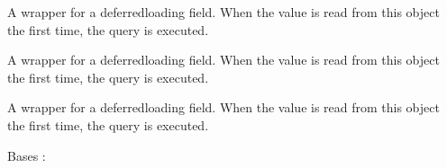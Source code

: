 \documentclass[letterpaper,10pt,french]{sphinxmanual}
\begin{document}
\begin{fulllineitems}

\begin{fulllineitems}
\label{\detokenize{index:bookings.models.Capacity.max_places}}
\pysigstartsignatures
\pysigline
{}
\pysigstopsignatures
\sphinxAtStartPar
A wrapper for a deferred\sphinxhyphen{}loading field. When the value is read from this
object the first time, the query is executed.

\end{fulllineitems}


\begin{fulllineitems}
\label{\detokenize{index:bookings.models.Capacity.number_locations}}
\pysigstartsignatures
\pysigline
{}
\pysigstopsignatures
\sphinxAtStartPar
A wrapper for a deferred\sphinxhyphen{}loading field. When the value is read from this
object the first time, the query is executed.

\end{fulllineitems}


\begin{fulllineitems}
\label{\detokenize{index:bookings.models.Capacity.number_mobile_homes}}
\pysigstartsignatures
\pysigline
{}
\pysigstopsignatures
\sphinxAtStartPar
A wrapper for a deferred\sphinxhyphen{}loading field. When the value is read from this
object the first time, the query is executed.

\end{fulllineitems}


\begin{fulllineitems}
\label{\detokenize{index:bookings.models.Capacity.DoesNotExist}}
\pysigstartsignatures
\pysigline
{}
\pysigstopsignatures
\sphinxAtStartPar
Bases : 


\end{fulllineitems}
\end{fulllineitems}
\end{document}
